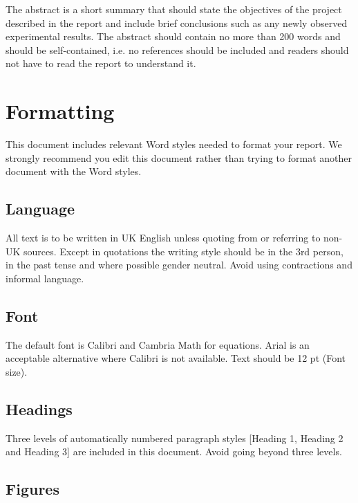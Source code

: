 \documentclass[12pt]{article}
\begin{document}
The abstract is a short summary that should state the objectives of the
project described in the report and include brief conclusions such as
any newly observed experimental results. The abstract should contain no
more than 200 words and should be self-contained, i.e. no references
should be included and readers should not have to read the report to
understand it.

\hypertarget{formatting}{%
\section{Formatting}\label{formatting}}

This document includes relevant Word styles needed to format your
report. We {strongly recommend} you edit this document rather than
trying to format another document with the Word styles.

\hypertarget{language}{%
\subsection{Language}\label{language}}

All text is to be written in UK English unless quoting from or referring
to non-UK sources. Except in quotations the writing style should be in
the 3rd person, in the past tense and where possible gender neutral.
Avoid using contractions and informal language.

\hypertarget{font}{%
\subsection{Font}\label{font}}

The default font is Calibri and Cambria Math for equations. Arial is an
acceptable alternative where Calibri is not available. Text should be 12
pt (Font size).

\hypertarget{headings}{%
\subsection{Headings}\label{headings}}

Three levels of automatically numbered paragraph styles {[}Heading 1,
Heading 2 and Heading 3{]} are included in this document. Avoid going
beyond three levels.

\hypertarget{figures}{%
\subsection{Figures}\label{figures}}
\end{document}
